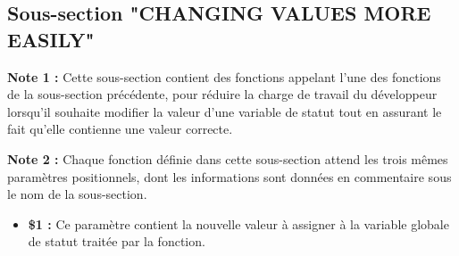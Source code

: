 \documentclass[a4paper,10pt]{article}
\begin{document}
    \color{sec2}
    \subsection{Sous-section "CHANGING VALUES MORE EASILY"}\color{text}

    \begin{justify}
        \textbf{Note 1 :} Cette sous-section contient des fonctions appelant l'une des fonctions de la sous-section précédente, pour réduire la charge de travail du développeur lorsqu'il souhaite modifier la valeur d'une variable de statut tout en assurant le fait qu'elle contienne une valeur correcte.
    \end{justify}

    \setlength{\parskip}{1em}

    \begin{justify}
        \textbf{Note 2 :} Chaque fonction définie dans cette sous-section attend les trois mêmes paramètres positionnels, dont les informations sont données en commentaire sous le nom de la sous-section.
    \end{justify}

    \begin{itemize}
        \item
        {
            \begin{justify}
                \textbf{\$1 :} Ce paramètre contient la nouvelle valeur à assigner à la variable globale de statut traitée par la fonction.
            \end{justify}


        }
    \end{itemize}
\end{document}
